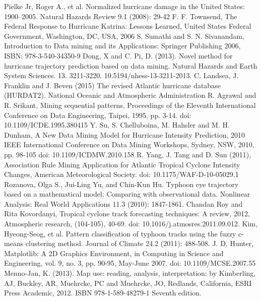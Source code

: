 \documentclass[12pt,conference]{IEEEtran}
\begin{document}
\begin{thebibliography}{1}
 Pielke Jr, Roger A., et al. Normalized hurricane damage in the United States: 1900–2005. Natural Hazards Review 9.1 (2008): 29-42
 F. F. Townsend, The Federal Response to Hurricane Katrina: Lessons Learned, United States Federal Government, Washington, DC, USA, 2006
 S. Sumathi and S. N. Sivanandam, Introduction to Data mining and its Applications: Springer Publishing 2006, ISBN: 978-3-540-34350-9
 Dong, X and C. Pi, D. (2013). Novel method for hurricane trajectory prediction based on data mining. Natural Hazards and Earth System Sciences. 13. 3211-3220. 10.5194/nhess-13-3211-2013. 
 C. Landsea, J. Franklin and J. Beven (2015) The revised Atlantic hurricane database (HURDAT2). National Oceanic and Atmospheric Administration
 R. Agrawal and R. Srikant, Mining sequential patterns, Proceedings of the Eleventh International Conference on Data Engineering, Taipei, 1995, pp. 3-14.
doi: 10.1109/ICDE.1995.380415
 Y. Su, S. Chelluboina, M. Hahsler and M. H. Dunham, A New Data Mining Model for Hurricane Intensity Prediction, 2010 IEEE International Conference on Data Mining Workshops, Sydney, NSW, 2010, pp. 98-105
doi: 10.1109/ICDMW.2010.158
 R. Yang, J. Tang and D. Sun (2011), Association Rule Mining Application for Atlantic Tropical Cyclone Intensity Changes, American Meteorological Society. doi: 10.1175/WAF-D-10-05029.1
 Rozanova, Olga S., Jui-Ling Yu, and Chin-Kun Hu. Typhoon eye trajectory based on a mathematical model: Comparing with observational data. Nonlinear Analysis: Real World Applications 11.3 (2010): 1847-1861.
 Chandan Roy and Rita Kovordanyi, Tropical cyclone track forecasting techniques: A review, 2012, Atmospheric research, (104-105), 40-69. doi: 10.1016/j.atmosres.2011.09.012.
 Kim, Hyeong-Seog, et al. Pattern classification of typhoon tracks using the fuzzy c-means clustering method. Journal of Climate 24.2 (2011): 488-508.
 J. D. Hunter, Matplotlib: A 2D Graphics Environment, in Computing in Science and Engineering, vol. 9, no. 3, pp. 90-95, May-June 2007.
doi: 10.1109/MCSE.2007.55
 Menno-Jan, K. (2013). Map use: reading, analysis, interpretation: by Kimberling, AJ, Buckley, AR, Muehrcke, PC and Muehrcke, JO, Redlands, California, ESRI Press Academic, 2012. ISBN 978-1-589-48279-1 Seventh edition.

\end{thebibliography}
\end{document}
